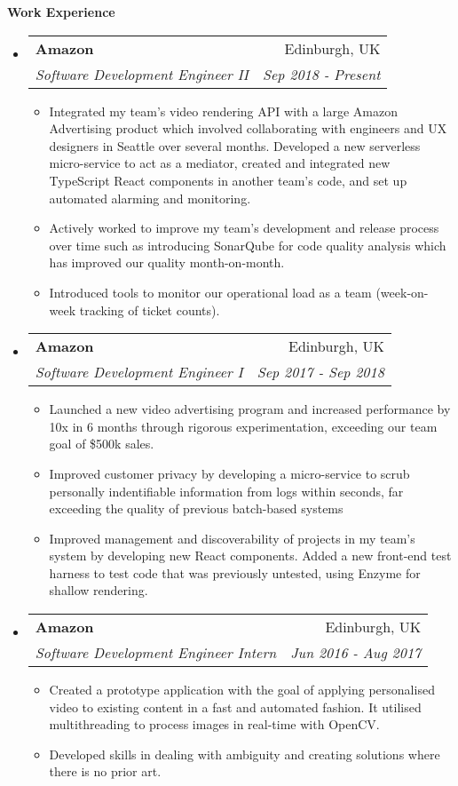 \documentclass[letterpaper,11pt]{article}
\makeatletter
\newcommand{\resitem}[1]{\item #1 \vspace{-2pt}}
\newcommand{\resheading}[1]{{\large \colorbox{mygrey}{\begin{minipage}{\textwidth}{\textbf{#1 \vphantom{p\^{E}}}}\end{minipage}}}}
\newcommand{\ressubheading}[4]{
\begin{tabular*}{7.0in}{l@{\extracolsep{\fill}}r}
	\textbf{#1} & #2 \\
	\textit{#3} & \textit{#4} \\
\end{tabular*}\vspace{-6pt}}
\makeatother
\begin{document}
	\resheading{Work Experience}
	\begin{itemize}
		\item
		\ressubheading{Amazon}{Edinburgh, UK}{Software Development Engineer II}{Sep 2018 - Present}
		\begin{itemize}
			\resitem{Integrated my team's video rendering API with a large Amazon Advertising product which involved collaborating with engineers and UX designers in Seattle over several months. Developed a new serverless micro-service to act as a mediator, created and integrated new TypeScript React components in another team's code, and set up automated alarming and monitoring.}
			\resitem{Actively worked to improve my team's development and release process over time such as introducing SonarQube for code quality analysis which has improved our quality month-on-month.} 
			\resitem{Introduced tools to monitor our operational load as a team (week-on-week tracking of ticket counts).}
		\end{itemize}
		
		\item
		\ressubheading{Amazon}{Edinburgh, UK}{Software Development Engineer I}{Sep 2017 - Sep 2018}
		\begin{itemize}
			\resitem{Launched a new video advertising program and increased performance by 10x in 6 months through rigorous experimentation, exceeding our team goal of \$500k sales.}
			\resitem{Improved customer privacy by developing a micro-service to scrub personally indentifiable information from logs within seconds, far exceeding the quality of previous batch-based systems}
			\resitem{Improved management and discoverability of projects in my team's system by developing new React components. Added a new front-end test harness to test code that was previously untested, using Enzyme for shallow rendering.}
		\end{itemize}
	
		\item
		\ressubheading{Amazon}{Edinburgh, UK}{Software Development Engineer Intern}{Jun 2016 - Aug 2017}
		\begin{itemize}
			\resitem{Created a prototype application with the goal of applying personalised video to existing content in a fast
			and automated fashion. It utilised multithreading to process images in real-time with OpenCV.}
			\resitem{Developed skills in dealing with ambiguity and creating solutions where there is no prior art.}
		\end{itemize}


\end{itemize}
\end{document}

